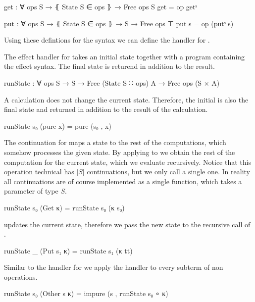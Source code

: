 \begin{code}
get : ∀ {ops S} → ⦃ State S ∈ ops ⦄ → Free ops S
get = op getˢ

put : ∀ {ops S} → ⦃ State S ∈ ops ⦄ → S → Free ops ⊤
put s = op (putˢ s)
\end{code}
Using these defintions for the syntax we can define the handler for
.

\begin{AgdaAlign}
The effect handler for  takes an initial state together
with a program containing the effect syntax.
The final state is returend in addition to the result.

\begin{code}
runState : ∀ {ops S} → S → Free (State S ∷ ops) A → Free ops (S × A)
\end{code}
A  calculation does not change the current state.
Therefore, the initial is also the final state and returned in addition to the
result of the calculation.
\begin{code}
runState s₀ (pure x)     = pure (s₀ , x)
\end{code}
The continuation for  maps a state to the rest of the
computations, which somehow processes the given state.
By applying  to  we obtain the rest of the
computation for the current state, which we evaluate recursively.
Notice that this operation technical has $|S|$ continuations, but we only call a
single one.
In reality all continuations are of course implemented as a single function,
which takes a parameter of type $S$.
\begin{code}
runState s₀ (Get κ)      = runState s₀ (κ s₀)
\end{code}
 updates the current state, therefore we pass the new state
 to the recursive call of .
\begin{code}
runState _  (Put s₁ κ)   = runState s₁ (κ tt)
\end{code}
Similar to the handler for  we apply the handler to every
subterm of non  operations.
\begin{code}
runState s₀ (Other s κ)  = impure (s , runState s₀ ∘ κ)
\end{code}
\end{AgdaAlign}


